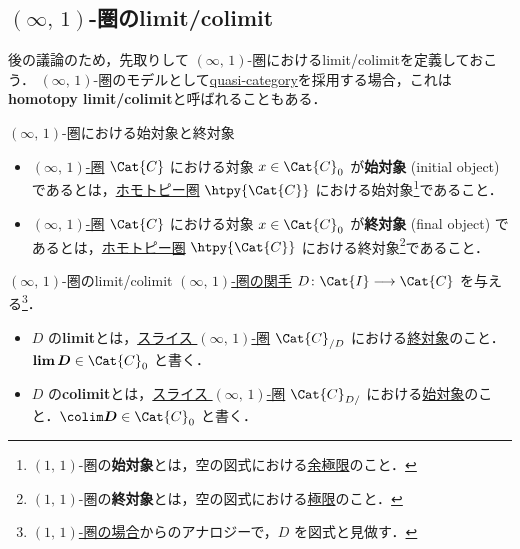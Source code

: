 \documentclass[TQFT_main]{subfiles}
\begin{document}
\subsection{{$(\infty,\, 1)$}-圏のlimit/colimit}

後の議論のため，先取りして $(\infty,\, 1)$-圏におけるlimit/colimitを定義しておこう．
$(\infty,\, 1)$-圏のモデルとして\hyperref[def:infinity-1]{quasi-category}を採用する場合，これは\textbf{homotopy limit/colimit}と呼ばれることもある．

\begin{mydef}[label=def:initial-final-infty]{{$(\infty,\, 1)$}-圏における始対象と終対象}
    \begin{itemize}
        \item \hyperref[def:infinity-1]{$(\infty,\, 1)$-圏} $\Cat{C}$ における対象 $x \in \Cat{C}_0$ が\textbf{始対象} (initial object) であるとは，\hyperref[def:hcat-infty]{ホモトピー圏} $\htpy{\Cat{C}}$ における始対象\footnote{$(1,\, 1)$-圏の\textbf{始対象}とは，空の図式における\hyperref[def:colim]{余極限}のこと．}であること．
        \item \hyperref[def:infinity-1]{$(\infty,\, 1)$-圏} $\Cat{C}$ における対象 $x \in \Cat{C}_0$ が\textbf{終対象} (final object) であるとは，\hyperref[def:hcat-infty]{ホモトピー圏} $\htpy{\Cat{C}}$ における終対象\footnote{$(1,\, 1)$-圏の\textbf{終対象}とは，空の図式における\hyperref[def:lim]{極限}のこと．}であること．
    \end{itemize}
\end{mydef}

\begin{mydef}[label=def:lim-colim-infty]{{$(\infty,\, 1)$}-圏のlimit/colimit}
    \hyperref[def:infinity-1]{$(\infty,\, 1)$-圏の関手} $D \colon \Cat{I} \lto \Cat{C}$ を与える\footnote{\hyperref[def:diagram]{$(1,\, 1)$-圏の場合}からのアナロジーで，$D$ を図式と見做す．}．
    \begin{itemize}
        \item $D$ の\textbf{limit}とは，\hyperref[def:overcat-infty]{スライス $(\infty,\, 1)$-圏} $\Cat{C}_{/D}$ における\hyperref[def:initial-final-infty]{終対象}のこと．$\bm{\lim D} \in \Cat{C}_0$ と書く．
        \item $D$ の\textbf{colimit}とは，\hyperref[def:overcat-infty]{スライス $(\infty,\, 1)$-圏} $\Cat{C}_{D/}$ における\hyperref[def:initial-final-infty]{始対象}のこと．$\bm{\colim D} \in \Cat{C}_0$ と書く．
    \end{itemize}
\end{mydef}
\end{document}
